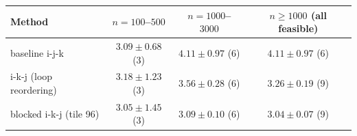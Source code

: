 \begin{tabular}{lccc}
\toprule
Method & $n=100$--$500$ & $n=1000$--$3000$ & $n\ge1000$ (all feasible) \\
\midrule
baseline i-j-k & $3.09 \pm 0.68$ (3) & $4.11 \pm 0.97$ (6) & $4.11 \pm 0.97$ (6) \\
i-k-j (loop reordering) & $3.18 \pm 1.23$ (3) & $3.56 \pm 0.28$ (6) & $3.26 \pm 0.19$ (9) \\
blocked i-k-j (tile 96) & $3.05 \pm 1.45$ (3) & $3.09 \pm 0.10$ (6) & $3.04 \pm 0.07$ (9) \\
\bottomrule
\end{tabular}
